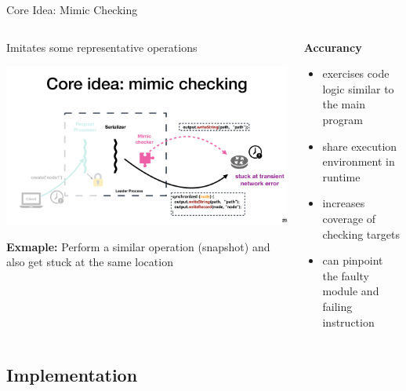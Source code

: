 \documentclass[aspectratio=169]{beamer}
\begin{document}
\begin{frame}{Core Idea: Mimic Checking}
    \begin{columns}
        \begin{column}{.6\textwidth}
            Imitates some representative operations
            \begin{center}
                \includegraphics[width=\textwidth]{fig/mimic}
            \end{center}
            \textbf{Exmaple:} Perform a similar operation (snapshot) and also get stuck at the same location
        \end{column}

        \begin{column}{.4\textwidth}
            \begin{block}{\textbf{Accurancy}}
                \begin{itemize}
                    \item exercises code logic similar to the main program
                    \item share execution environment in runtime
                    \item increases coverage of checking targets
                    \item can pinpoint the faulty module and failing instruction
                \end{itemize}
            \end{block}
        \end{column}
    \end{columns}

\end{frame}

\subsection{Implementation}
\end{document}
